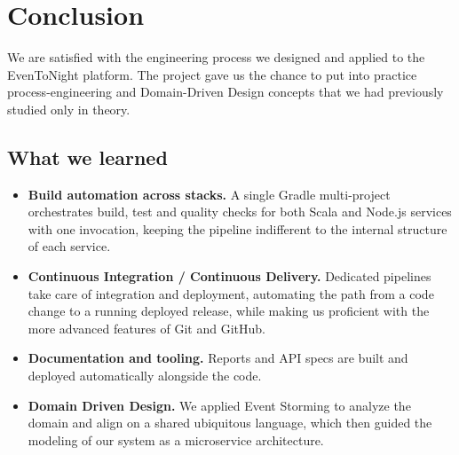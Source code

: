 \section{Conclusion}

We are satisfied with the engineering process we designed and applied to the EvenToNight platform. The project gave us the chance to put into practice process-engineering and Domain-Driven Design concepts that we had previously studied only in theory.

\subsection*{What we learned}

\begin{itemize}
  \item \textbf{Build automation across stacks.}
  A single Gradle multi-project orchestrates build, test and quality checks for both Scala and Node.js services with one invocation, keeping the pipeline indifferent to the internal structure of each service.
  \item \textbf{Continuous Integration / Continuous Delivery.}
  Dedicated pipelines take care of integration and deployment, automating the path from a code change to a running deployed release, while making us proficient with the more advanced features of Git and GitHub.
  \item \textbf{Documentation and tooling.}
  Reports and API specs are built and deployed automatically alongside the code.
  \item \textbf{Domain Driven Design.}
  We applied Event Storming to analyze the domain and align on a shared ubiquitous language, which then guided the modeling of our system as a microservice architecture.
\end{itemize}
